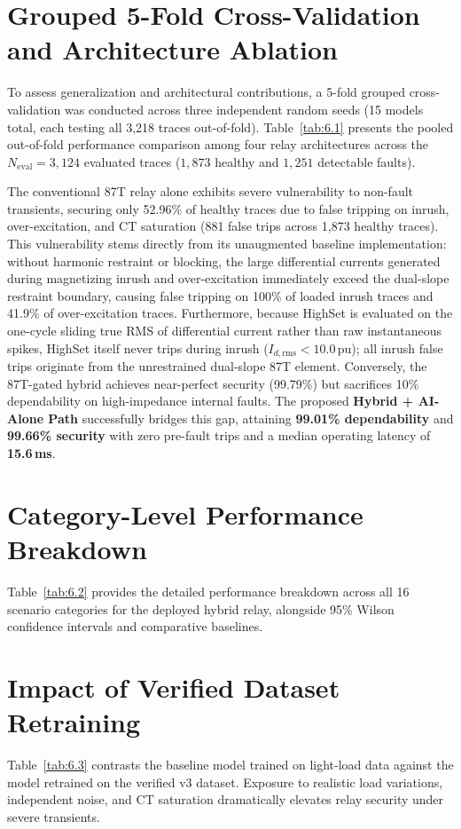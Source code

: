 \documentclass[12pt,a4paper,oneside]{report}
\begin{document}
\section{Grouped 5-Fold Cross-Validation and Architecture Ablation}
To assess generalization and architectural contributions, a 5-fold grouped cross-validation was conducted across three independent random seeds (15 models total, each testing all 3,218 traces out-of-fold). Table~\ref{tab:6.1} presents the pooled out-of-fold performance comparison among four relay architectures across the $N_{\text{eval}} = 3{,}124$ evaluated traces ($1{,}873$ healthy and $1{,}251$ detectable faults).



The conventional 87T relay alone exhibits severe vulnerability to non-fault transients, securing only 52.96\% of healthy traces due to false tripping on inrush, over-excitation, and CT saturation (881 false trips across 1,873 healthy traces). This vulnerability stems directly from its unaugmented baseline implementation: without harmonic restraint or blocking, the large differential currents generated during magnetizing inrush and over-excitation immediately exceed the dual-slope restraint boundary, causing false tripping on 100\% of loaded inrush traces and 41.9\% of over-excitation traces. Furthermore, because HighSet is evaluated on the one-cycle sliding true RMS of differential current rather than raw instantaneous spikes, HighSet itself never trips during inrush ($I_{d,\text{rms}} < 10.0$\,pu); all inrush false trips originate from the unrestrained dual-slope 87T element. Conversely, the 87T-gated hybrid achieves near-perfect security (99.79\%) but sacrifices 10\% dependability on high-impedance internal faults. The proposed \textbf{Hybrid + AI-Alone Path} successfully bridges this gap, attaining \textbf{99.01\% dependability} and \textbf{99.66\% security} with zero pre-fault trips and a median operating latency of \textbf{15.6\,ms}.

\section{Category-Level Performance Breakdown}
Table~\ref{tab:6.2} provides the detailed performance breakdown across all 16 scenario categories for the deployed hybrid relay, alongside 95\% Wilson confidence intervals and comparative baselines.



\section{Impact of Verified Dataset Retraining}
Table~\ref{tab:6.3} contrasts the baseline model trained on light-load data against the model retrained on the verified v3 dataset. Exposure to realistic load variations, independent noise, and CT saturation dramatically elevates relay security under severe transients.
\end{document}
